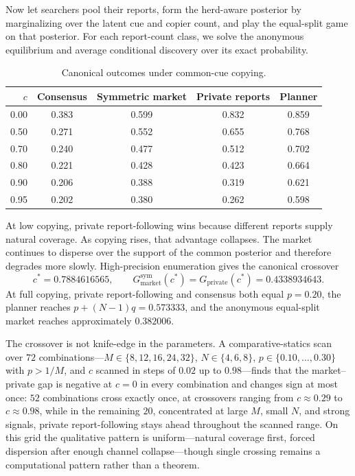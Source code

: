 \documentclass[11pt]{article}
\theoremstyle{definition}
\theoremstyle{remark}
\newcommand{\1}{\mathbf{1}}
\newcommand{\priv}{\mathrm{private}}
\newcommand{\mkt}{\mathrm{market}}
\begin{document}
Now let searchers pool their reports, form the herd-aware posterior by marginalizing over the latent cue and copier count, and play the equal-split game on that posterior. For each report-count class, we solve the anonymous equilibrium and average conditional discovery over its exact probability.

\begin{table}[t]
\centering
\caption{Canonical outcomes under common-cue copying.}
\label{tab:copying}
\begin{tabular}{rcccc}
\toprule
$c$ & Consensus & Symmetric market & Private reports & Planner\\
\midrule
0.00 & 0.383 & 0.599 & 0.832 & 0.859\\
0.50 & 0.271 & 0.552 & 0.655 & 0.768\\
0.70 & 0.240 & 0.477 & 0.512 & 0.702\\
0.80 & 0.221 & 0.428 & 0.423 & 0.664\\
0.90 & 0.206 & 0.388 & 0.319 & 0.621\\
0.95 & 0.202 & 0.380 & 0.262 & 0.598\\
\bottomrule
\end{tabular}
\end{table}

At low copying, private report-following wins because different reports supply natural coverage. As copying rises, that advantage collapses. The market continues to disperse over the support of the common posterior and therefore degrades more slowly. High-precision enumeration gives the canonical crossover
\begin{equation}
c^*=0.7884616565,
\qquad
G_{\mkt}^{\mathrm{sym}}(c^*)=G_{\priv}(c^*)=0.4338934643.
\label{eq:crossover}
\end{equation}
At full copying, private report-following and consensus both equal $p=0.20$, the planner reaches $p+(N-1)q=0.573333$, and the anonymous equal-split market reaches approximately $0.382006$.

The crossover is not knife-edge in the parameters. A comparative-statics scan over $72$ combinations---$M\in\{8,12,16,24,32\}$, $N\in\{4,6,8\}$, $p\in\{0.10,\ldots,0.30\}$ with $p>1/M$, and $c$ scanned in steps of $0.02$ up to $0.98$---finds that the market--private gap is negative at $c=0$ in every combination and changes sign at most once: $52$ combinations cross exactly once, at crossovers ranging from $c\approx0.29$ to $c\approx0.98$, while in the remaining $20$, concentrated at large $M$, small $N$, and strong signals, private report-following stays ahead throughout the scanned range. On this grid the qualitative pattern is uniform---natural coverage first, forced dispersion after enough channel collapse---though single crossing remains a computational pattern rather than a theorem.
\end{document}
